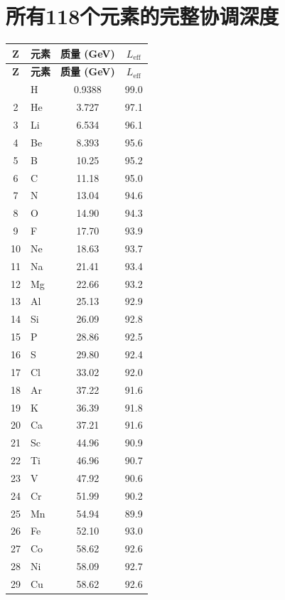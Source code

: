 \documentclass[11pt,a4paper]{article}
\begin{document}
	\section*{所有118个元素的完整协调深度}
	\label{sec:full_Leff}
	\begin{longtable}{c l c c}
		\toprule
		\textbf{Z} & \textbf{元素} & \textbf{质量 (GeV)} & \textbf{\(L_{\mathrm{eff}}\)} \\
		\midrule
		\endfirsthead
		\toprule
		\textbf{Z} & \textbf{元素} & \textbf{质量 (GeV)} & \textbf{\(L_{\mathrm{eff}}\)} \\
		\midrule
		\endhead
		\bottomrule
		\endfoot
		1  & H   & 0.9388 & 99.0 \\
		2  & He  & 3.727  & 97.1 \\
		3  & Li  & 6.534  & 96.1 \\
		4  & Be  & 8.393  & 95.6 \\
		5  & B   & 10.25  & 95.2 \\
		6  & C   & 11.18  & 95.0 \\
		7  & N   & 13.04  & 94.6 \\
		8  & O   & 14.90  & 94.3 \\
		9  & F   & 17.70  & 93.9 \\
		10 & Ne  & 18.63  & 93.7 \\
		11 & Na  & 21.41  & 93.4 \\
		12 & Mg  & 22.66  & 93.2 \\
		13 & Al  & 25.13  & 92.9 \\
		14 & Si  & 26.09  & 92.8 \\
		15 & P   & 28.86  & 92.5 \\
		16 & S   & 29.80  & 92.4 \\
		17 & Cl  & 33.02  & 92.0 \\
		18 & Ar  & 37.22  & 91.6 \\
		19 & K   & 36.39  & 91.8 \\
		20 & Ca  & 37.21  & 91.6 \\
		21 & Sc  & 44.96  & 90.9 \\
		22 & Ti  & 46.96  & 90.7 \\
		23 & V   & 47.92  & 90.6 \\
		24 & Cr  & 51.99  & 90.2 \\
		25 & Mn  & 54.94  & 89.9 \\
		26 & Fe  & 52.10  & 93.0 \\
		27 & Co  & 58.62  & 92.6 \\
		28 & Ni  & 58.09  & 92.7 \\
		29 & Cu  & 58.62  & 92.6 \\

\end{longtable}
\end{document}
